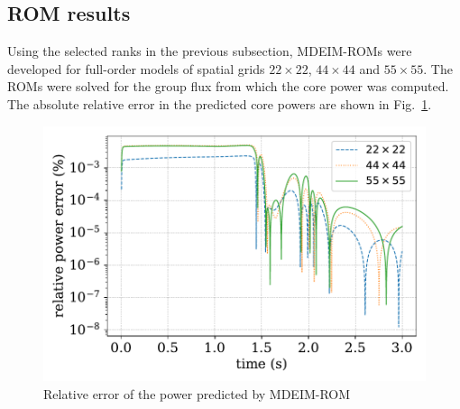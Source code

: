 \documentclass[]{interact}
\theoremstyle{plain}%
\theoremstyle{definition}
\theoremstyle{remark}
\begin{document}
\subsection{ROM results}

Using the selected ranks in the previous subsection, MDEIM-ROMs were developed for full-order models of spatial grids $22\times 22$, $44\times44$ and $55 \times 55$.
The ROMs were solved for the group flux from which the core power was computed.
The absolute relative error in the predicted core powers are shown in Fig.~\ref{fig:deim power error}.

\begin{figure}[H]
	\includegraphics[width=1.0\linewidth]{../figures/LRA_power_deim_relative_error.pdf}
	\caption{Relative error of the power predicted by MDEIM-ROM}
	\label{fig:deim power error}
\end{figure}
\end{document}
